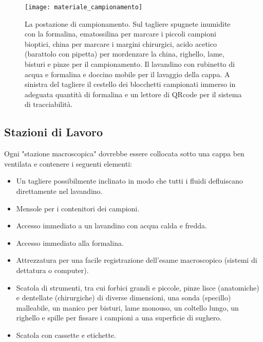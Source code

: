 \begin{figure}[h]
    \centering
    \texttt{[image: materiale\_campionamento]}
    \caption{La postazione di campionamento. Sul tagliere spugnete inumidite con la formalina, ematossilina per marcare i piccoli campioni bioptici, china per marcare i margini chirurgici, acido acetico (barattolo con pipetta) per mordenzare la china, righello, lame, bisturi e pinze per il campionamento. Il lavandino con rubinetto di acqua e formalina  e doccino mobile per il lavaggio della cappa. A sinistra del tagliere il cestello dei blocchetti campionati immerso in adeguata quantità di formalina e un lettore di QRcode per il sistema di tracciabilità.}
    \label{fig:materiale_campionamento}
\end{figure}

\subsection{Stazioni di Lavoro}
Ogni "stazione macroscopica" dovrebbe essere collocata sotto una cappa ben ventilata e contenere i seguenti elementi:
\begin{itemize}
    \item Un tagliere possibilmente inclinato in modo che tutti i fluidi defluiscano direttamente nel lavandino.
    \item Mensole per i contenitori dei campioni.
    \item Accesso immediato a un lavandino con acqua calda e fredda.
    \item Accesso immediato alla formalina.
    \item Attrezzatura per una facile registrazione dell'esame macroscopico (sistemi di dettatura o computer).
    \item Scatola di strumenti, tra cui forbici grandi e piccole, pinze lisce (anatomiche) e dentellate  (chirurgiche) di diverse dimensioni, una sonda (specillo) malleabile, un manico per bisturi, lame monouso, un coltello lungo, un righello e spille per fissare i campioni a una superficie di sughero.
    \item Scatola con cassette e etichette.
\end{itemize}
% 
